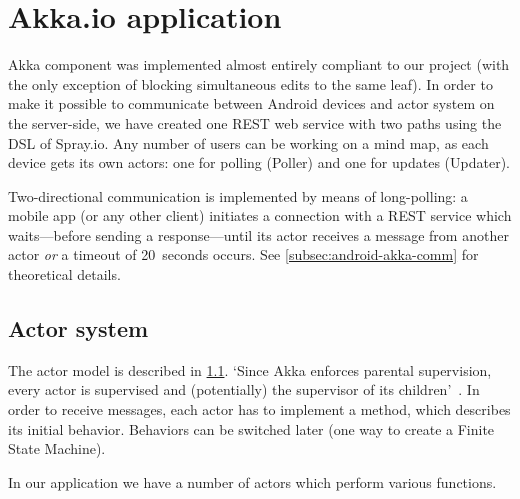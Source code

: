 %
%
%
%
%

\section{Akka.io application}
\label{sec:akka-app}

Akka component was implemented almost entirely compliant to our project (with the only exception of blocking simultaneous edits to the same leaf).  In order to make it possible to communicate between Android devices and actor system on the server-side, we have created one REST web service with two paths using the DSL of Spray.io. Any number of users can be working on a mind map, as each device gets its own actors: one for polling (Poller) and one for updates (Updater).

Two-directional communication is implemented by means of long-polling: a mobile app (or any other client) initiates a connection with a REST service which waits---before sending a response---until its actor receives a message from another actor \emph{or} a timeout of 20~seconds occurs. See \cref{subsec:android-akka-comm} for theoretical details.  

\subsection{Actor system}
\label{subsection:akka-actors}
The actor model is described in \cref{subsection:akka-actors}. `Since Akka enforces parental supervision, every actor is supervised and (potentially) the supervisor of its children'~\cite{AkkaDoc:2013:Actors}. In order to receive messages, each actor has to implement a  method, which describes its initial behavior. Behaviors can be switched later (one way to create a Finite State Machine).

In our application we have a number of actors which perform various functions.

